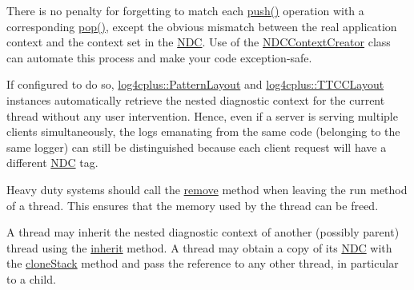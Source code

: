 There is no penalty for forgetting to match each \hyperlink{classlog4cplus_1_1NDC_a5ce2b0d8e4c225613fdd8a642a01c992}{push()} operation with a corresponding \hyperlink{classlog4cplus_1_1NDC_a3f446e2479800b222b31cf7e30628c41}{pop()}, except the obvious mismatch between the real application context and the context set in the \hyperlink{classlog4cplus_1_1NDC}{N\-D\-C}. Use of the \hyperlink{classlog4cplus_1_1NDCContextCreator}{N\-D\-C\-Context\-Creator} class can automate this process and make your code exception-\/safe.

If configured to do so, \hyperlink{classlog4cplus_1_1PatternLayout}{log4cplus\-::\-Pattern\-Layout} and \hyperlink{classlog4cplus_1_1TTCCLayout}{log4cplus\-::\-T\-T\-C\-C\-Layout} instances automatically retrieve the nested diagnostic context for the current thread without any user intervention. Hence, even if a server is serving multiple clients simultaneously, the logs emanating from the same code (belonging to the same logger) can still be distinguished because each client request will have a different \hyperlink{classlog4cplus_1_1NDC}{N\-D\-C} tag.

Heavy duty systems should call the \hyperlink{classlog4cplus_1_1NDC_a43f2d8571dc52f6dc2bd737bb3f88099}{remove} method when leaving the run method of a thread. This ensures that the memory used by the thread can be freed.

A thread may inherit the nested diagnostic context of another (possibly parent) thread using the \hyperlink{classlog4cplus_1_1NDC_a64169c244e495627d267f8d2d1105d32}{inherit} method. A thread may obtain a copy of its \hyperlink{classlog4cplus_1_1NDC}{N\-D\-C} with the \hyperlink{classlog4cplus_1_1NDC_a7a41cf75e0c46a6529dbd17755c5a97b}{clone\-Stack} method and pass the reference to any other thread, in particular to a child. 

